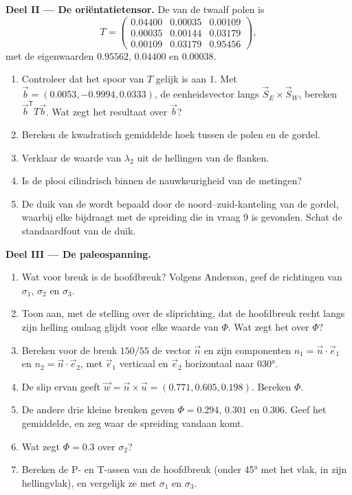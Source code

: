 \begin{problem}
\medskip\noindent\textbf{Deel II --- De oriëntatietensor.}
De  van de twaalf polen is
\[
  T = \begin{pmatrix} 0.04400 & 0.00035 & 0.00109\\ 0.00035 & 0.00144 & 0.03179\\
  0.00109 & 0.03179 & 0.95456 \end{pmatrix},
\]
met de eigenwaarden $0.95562$, $0.04400$ en $0.00038$.
\begin{enumerate}[resume]
  \item Controleer dat het spoor van $T$ gelijk is aan 1. Met $\vec b = (0.0053, -0.9994,
        0.0333)$, de eenheidsvector langs $\vec S_E\times\vec S_W$, bereken
        $\vec b^{\mathsf T}T\vec b$. Wat zegt het resultaat over $\vec b$?
  \item Bereken de kwadratisch gemiddelde hoek tussen de polen en de gordel.
  \item Verklaar de waarde van $\lambda_2$ uit de hellingen van de flanken.
  \item Is de plooi cilindrisch binnen de nauwkeurigheid van de metingen?
  \item De duik van de  wordt bepaald door de noord--zuid-kanteling van de
        gordel, waarbij elke  bijdraagt met de spreiding die in
        vraag 9 is gevonden. Schat de standaardfout van de duik.
\end{enumerate}

\medskip\noindent\textbf{Deel III --- De paleospanning.}
\begin{enumerate}[resume]
  \item Wat voor breuk is de hoofdbreuk? Volgens Anderson, geef de
        richtingen van $\sigma_1$, $\sigma_2$ en $\sigma_3$.
  \item Toon aan, met de stelling over de sliprichting, dat de hoofdbreuk
        recht langs zijn helling omlaag glijdt voor elke waarde van $\Phi$. Wat zegt het
        over $\Phi$?
  \item Bereken voor de breuk $150/55$ de vector $\vec n$ en zijn componenten $n_1 =
        \vec n\cdot\vec e_1$ en $n_2 = \vec n\cdot\vec e_2$, met $\vec e_1$
        verticaal en $\vec e_2$ horizontaal naar \ang{030}.
  \item De slip ervan geeft $\vec w = \vec n\times\vec u = (0.771, 0.605, 0.198)$.
        Bereken $\Phi$.
  \item De andere drie kleine breuken geven $\Phi = 0.294$, $0.301$ en
        $0.306$. Geef het gemiddelde, en zeg waar de spreiding vandaan komt.
  \item Wat zegt $\Phi = 0.3$ over $\sigma_2$?
  \item Bereken de P- en T-assen van de hoofdbreuk (onder \ang{45} met het
        vlak, in zijn hellingvlak), en vergelijk ze met $\sigma_1$ en
        $\sigma_3$.
\end{enumerate}


\end{problem}

